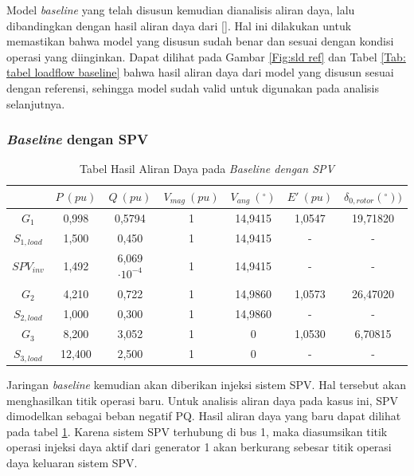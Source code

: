 Model \textit{baseline} yang telah disusun kemudian dianalisis aliran daya, lalu dibandingkan dengan hasil aliran daya dari []. Hal ini dilakukan untuk memastikan bahwa model yang disusun sudah benar dan sesuai dengan kondisi operasi yang diinginkan. Dapat dilihat pada Gambar \ref{Fig:sld ref} dan Tabel \ref{Tab: tabel loadflow baseline} bahwa hasil aliran daya dari model yang disusun sesuai dengan referensi, sehingga model sudah valid untuk digunakan pada analisis selanjutnya.

\subsubsection{\textit{Baseline} dengan SPV}

\begin{table}[ht]
	\caption{Tabel Hasil Aliran Daya pada \textit{Baseline dengan SPV}}
	\vspace{0.5em}
	\centering
	\begin{tabular}{|c|c|c|c|c|c|c|}
		\hline
		 & $\mathit{P \ (pu)}$ & $\mathit{Q \ (pu)}$ & $\mathit{V_{mag} \ (pu)}$ & $\mathit{V_{ang} \ (^{\circ})}$ & $\mathit{E' \ (pu)}$ & $\delta_{0,rotor} (^{\circ}))$ \\
		\hline
		$\mathit{G_1}$ & 0,998 & 0,5794 & 1 & 14,9415 & 1,0547 & 19,71820 \\
		$\mathit{S_{1,load}}$ & 1,500 & 0,450 & 1 & 14,9415 & - & - \\
		$\mathit{SPV_{inv}}$ & 1,492 & 6,069 $\cdot 10^{-4}$ & 1 & 14,9415 & - & - \\
		$\mathit{G_2}$ & 4,210 & 0,722 & 1 & 14,9860 & 1,0573 & 26,47020 \\
		$\mathit{S_{2,load}}$ & 1,000 & 0,300 & 1 & 14,9860 & - & - \\
		$\mathit{G_3}$ & 8,200 & 3,052 & 1 & 0 & 1,0530 & 6,70815 \\
		$\mathit{S_{3,load}}$ & 12,400 & 2,500 & 1 & 0 & - & - \\
		\hline
	\end{tabular}
	\label{Tab: tabel loadflow SPV}
\end{table}

Jaringan \textit{baseline} kemudian akan diberikan injeksi sistem SPV. Hal tersebut akan menghasilkan titik operasi baru. Untuk analisis aliran daya pada kasus ini, SPV dimodelkan sebagai beban negatif PQ. Hasil aliran daya yang baru dapat dilihat pada tabel \ref{Tab: tabel loadflow SPV}. Karena sistem SPV terhubung di bus 1, maka diasumsikan titik operasi injeksi daya aktif dari generator 1 akan berkurang sebesar titik operasi daya keluaran sistem SPV.




